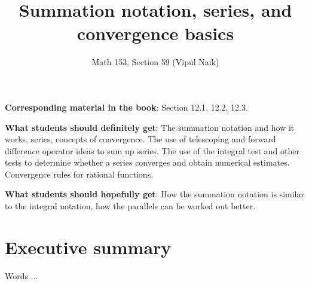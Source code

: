 \documentclass{amsart}
\title{Summation notation, series, and convergence basics}
\author{Math 153, Section 59 (Vipul Naik)}
\begin{document}
\maketitle

{\bf Corresponding material in the book}: Section 12.1, 12.2, 12.3.

{\bf What students should definitely get}: The summation notation and
how it works, series, concepts of convergence. The use of telescoping
and forward difference operator ideas to sum up series. The use of the
integral test and other tests to determine whether a series converges
and obtain numerical estimates. Convergence rules for rational
functions.

{\bf What students should hopefully get}: How the summation notation
is similar to the integral notation, how the parallels can be worked
out better.

\section*{Executive summary}

Words ...
\end{document}
